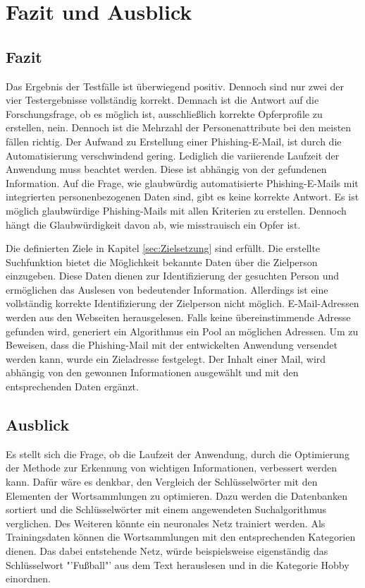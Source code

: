 \chapter{Fazit und Ausblick}
\label{chap:SchlussUndAusblick}
\section{Fazit}
Das Ergebnis der Testfälle ist überwiegend positiv. Dennoch sind nur zwei der vier Testergebnisse vollständig korrekt. Demnach ist die Antwort auf die Forschungsfrage, ob es möglich ist, ausschließlich korrekte Opferprofile zu erstellen, nein. Dennoch ist die Mehrzahl der Personenattribute bei den meisten fällen richtig. Der Aufwand zu Erstellung einer Phishing-E-Mail, ist durch die Automatisierung verschwindend gering. Lediglich die variierende Laufzeit der Anwendung muss beachtet werden. Diese ist abhängig von der gefundenen Information. Auf die Frage, wie glaubwürdig automatisierte Phishing-E-Mails mit integrierten personenbezogenen Daten sind, gibt es keine korrekte Antwort. Es ist möglich glaubwürdige Phishing-Mails mit allen Kriterien zu erstellen. Dennoch hängt die Glaubwürdigkeit davon ab, wie misstrauisch ein Opfer ist.

Die definierten Ziele in Kapitel \ref{sec:Zielsetzung} sind erfüllt. Die erstellte Suchfunktion bietet die Möglichkeit bekannte Daten über die Zielperson einzugeben. Diese Daten dienen zur Identifizierung der gesuchten Person und ermöglichen das Auslesen von bedeutender Information. Allerdings ist eine vollständig korrekte Identifizierung der Zielperson nicht möglich. E-Mail-Adressen werden aus den Webseiten herausgelesen. Falls keine übereinstimmende Adresse gefunden wird, generiert ein Algorithmus ein Pool an möglichen Adressen. Um zu Beweisen, dass die Phishing-Mail mit der entwickelten Anwendung versendet werden kann, wurde ein Zieladresse festgelegt. Der Inhalt einer Mail, wird abhängig von den gewonnen Informationen ausgewählt und mit den entsprechenden Daten ergänzt.

\section{Ausblick}
Es stellt sich die Frage, ob die Laufzeit der Anwendung, durch die Optimierung der Methode zur Erkennung von wichtigen Informationen, verbessert werden kann. Dafür wäre es denkbar, den Vergleich der Schlüsselwörter mit den Elementen der Wortsammlungen zu optimieren. Dazu werden die Datenbanken sortiert und die Schlüsselwörter mit einem angewendeten Suchalgorithmus verglichen. Des Weiteren könnte ein neuronales Netz trainiert werden. Als Trainingsdaten können die Wortsammlungen mit den entsprechenden Kategorien dienen. Das dabei entstehende Netz, würde beispielsweise eigenständig das Schlüsselwort "'Fußball"' aus dem Text herauslesen und in die Kategorie Hobby einordnen. 

